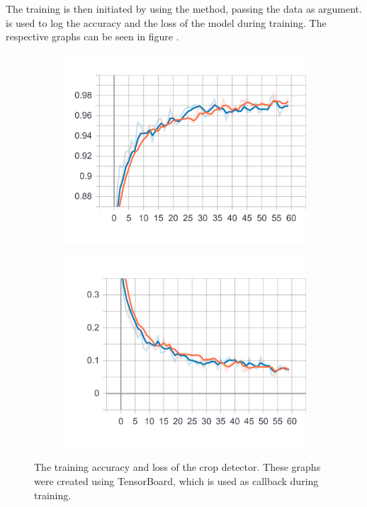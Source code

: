 The training is then initiated by using the  method, passing the data as argument.
is used to log the accuracy and the loss of the model during training. The respective graphs can be seen in figure \cite{fig:crop_detector_tensorboard}.

\begin{figure}[]
    \centering
    \begin{subfigure}[b]{0.45\textwidth}
        \includegraphics[width=\textwidth]{images/crop_detector_epoch_acc.png}
    \end{subfigure}
    \begin{subfigure}[b]{0.45\textwidth}
        \includegraphics[width=\textwidth]{images/crop_detector_epoch_loss.png}
    \end{subfigure}
    \caption{The training accuracy and loss of the crop detector. These graphs were created using TensorBoard, which is used as callback during training.}
    \label{fig:crop_detector_tensorboard}
\end{figure}


